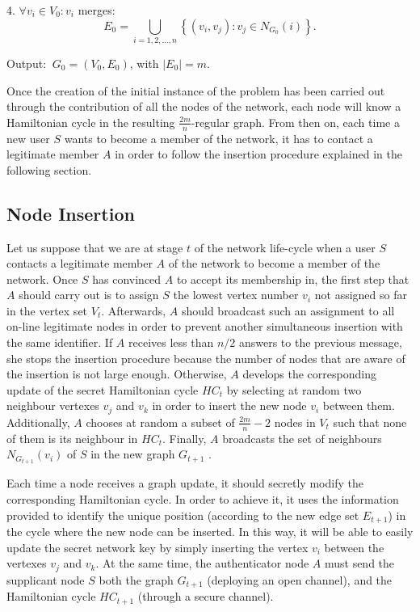 \documentclass{article}
\begin{document}
4. $\forall v_i \in V_{0}: v_i$ merges: $$ E_{0}= \bigcup _{i=1,2,...,n} \left\{ (v_i, v_j) : v_j \in N_{G_{0}}(i) \right \}.$$

Output:  $\ G_{0} = (V_{0}, E_{0})$, with $\left|E_{0}\right| = m $.

Once the creation of the initial instance of the problem has
been carried out through the contribution of all the nodes
of the network, each node will know a Hamiltonian
cycle in the resulting $\frac{2m}{n}$-regular graph. From then on,
each time a new user $S$ wants to become a member of the network,
it has to contact a legitimate member $A$ in order to follow the
insertion procedure explained in the following section.

\subsection{Node Insertion}


Let us suppose that we are at  stage $t$ of the network life-cycle
when a user $S$ contacts a legitimate member $A$ of the network to
become a member of the network. Once $S$ has convinced $A$ to
accept its membership in, the first step that $A$ should
carry out is to assign $S$ the lowest vertex number $v_i$ not assigned
so far in the vertex set $V_t$. Afterwards, $A$ should
broadcast such an assignment to all on-line legitimate nodes in order to prevent another simultaneous insertion with the same identifier. If $A$ receives
less than $n/2$ answers to the previous message, she stops the insertion procedure because
the number of nodes that are aware of the insertion is not large
enough. Otherwise, $A$ develops the corresponding update of the
secret Hamiltonian cycle $HC_t$ by selecting at random two
neighbour vertexes $v_j$ and $v_k$ in order to insert the new node
$v_i$ between them. Additionally, $A$ chooses at random a subset of $\frac{2m}{n} -2$
nodes in $V_t$ such that none of them is its neighbour in $HC_t$. Finally, $A$ broadcasts the set of neighbours $N_{G_{t+1}}(v_i)$ of $S$ in
the new graph $G_{t+1}$ .

Each time a node receives a graph update, it should secretly modify the corresponding Hamiltonian cycle. In order to achieve it, it uses the information provided to identify the unique position (according to the new edge set $E_{t+1}$) in the cycle where the new node can be inserted. In this way, it will be able to easily update the secret network key by simply inserting the vertex $v_i$ between the vertexes $v_j$ and $v_k$. At the same time, the
authenticator node $A$ must send the supplicant node $S$ both the graph $G_{t+1}$ (deploying an open channel), and  the Hamiltonian cycle $HC_{t+1}$ (through a secure channel).
\end{document}
